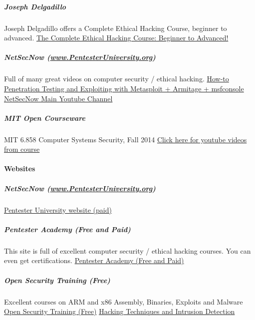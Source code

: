 \subparagraph{Joseph Delgadillo}

Joseph Delgadillo offers a Complete Ethical Hacking Course, beginner to advanced.\newline
\href{https://www.youtube.com/watch?v=vg9cNFPQFqM}{The Complete Ethical Hacking Course: Beginner to Advanced!}

\subparagraph{NetSecNow (\href{http://www.PentesterUniversity.org}{www.PentesterUniversity.org})}

Full of many great videos on computer security / ethical hacking.\newline
\href{https://www.youtube.com/watch?v=lZlqr2PFJIo\&t=2414s}{How-to Penetration Testing and Exploiting with Metasploit + Armitage + msfconsole}\newline
\href{https://www.youtube.com/channel/UC6J\_GnSAi7F2hY4RmnMcWJw}{NetSecNow Main Youtube Channel}

\subparagraph{MIT Open Courseware}

MIT 6.858 Computer Systems Security, Fall 2014\newline
\href{https://www.youtube.com/watch?v=yRVZPvHYHzw\&index=9\&list=PLUl4u3cNGP62K2DjQLRxDNRi0z2IRWnNh}{Click here for youtube videos from course}

\paragraph{Websites}

\subparagraph{NetSecNow (\href{http://www.PentesterUniversity.org}{www.PentesterUniversity.org})}

\href{https://www.pentesteruniversity.org/}{Pentester University website (paid)}

\subparagraph{Pentester Academy (Free and Paid)}

This site is full of excellent computer security / ethical hacking courses. You can even get certifications.\newline
\href{https://www.pentesteracademy.com/}{Pentester Academy (Free and Paid)}

\subparagraph{Open Security Training (Free)}

Excellent courses on ARM and x86 Assembly, Binaries, Exploits and Malware\newline
\href{http://www.opensecuritytraining.info/}{Open Security Training (Free)}\newline
\href{http://opensecuritytraining.info/HTID.html}{Hacking Techniques and Intrusion Detection}

